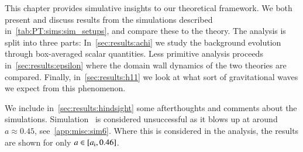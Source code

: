


\newcommand{\lbl}[1]{\textsf{\textbf{#1}}}
\newcommand{\completelbl}[4]{%
\textbf{#1)}%
\textbf{#2:}%
\lbl{#3.#4}%
}
\newcommand{\lcoord}{\ALIASlcoord}
\newcommand{\lcoordx}{\ALIASlcoordx}
\newcommand{\lcoordk}{\ALIASlcoordk}
\newcommand{\epsA}{\ALIASepsA}
\newcommand{\epsB}{\ALIASepsB}
\newcommand{\epsC}{\ALIASepsC}
\newcommand{\wallsep}{\ALIASwallsep}









This chapter provides simulative insights to our theoretical framework. We both present and discuss results from the simulations described in~\cref{tab:PT:sims:sim_setups}, and compare these to the theory. The analysis is split into three parts: In~\cref{sec:results:achi} we study the background evolution through box-averaged scalar quantities. Less primitive analysis proceeds in~\cref{sec:results:epsilon} where the domain wall dynamics of the two theories are compared. Finally, in~\cref{sec:results:h11} we look at what sort of gravitational waves we expect from this phenomenon. 

We include in~\cref{sec:results:hindsight} some afterthoughts and comments about the simulations. %
Simulation~ is considered unsuccessful as it blows up at around $a\approx 0.45$, see~\cref{app:misc:sim6}. Where this is considered in the analysis, the results are shown for only $a\in [a_\mathrm{i}, 0.46]$.







